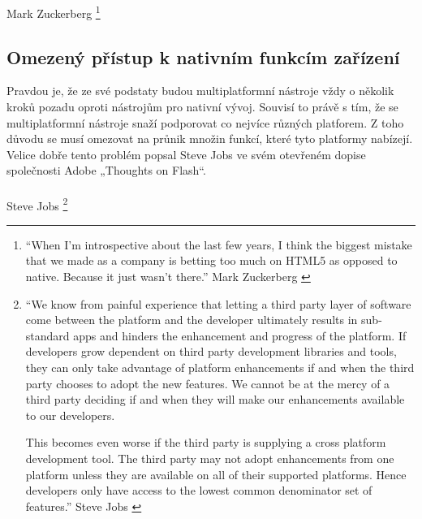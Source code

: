 \textit{} Mark Zuckerberg \cite{html5_isnt_fb_mistake}
\footnote{“When I'm introspective about the last few years, I think the biggest mistake that we made as a company is betting too much on HTML5 as opposed to native. Because it just wasn't there.” Mark Zuckerberg \cite{html5_isnt_fb_mistake}} \\

\subsection{Omezený přístup k nativním funkcím zařízení}
Pravdou je, že ze své podstaty budou multiplatformní nástroje vždy o několik kroků pozadu oproti nástrojům pro nativní vývoj. Souvisí to právě s tím, že se multiplatformní nástroje snaží podporovat co nejvíce různých platforem. Z toho důvodu se musí omezovat na průnik množin funkcí, které tyto platformy nabízejí. Velice dobře tento problém popsal Steve Jobs ve svém otevřeném dopise společnosti Adobe „Thoughts on Flash“.
\\ \\
\textit{} Steve Jobs \cite{thoughts_on_flash}
\footnote{“We know from painful experience that letting a third party layer of software come between the platform and the developer ultimately results in sub-standard apps and hinders the enhancement and progress of the platform. If developers grow dependent on third party development libraries and tools, they can only take advantage of platform enhancements if and when the third party chooses to adopt the new features. We cannot be at the mercy of a third party deciding if and when they will make our enhancements available to our developers.

This becomes even worse if the third party is supplying a cross platform development tool. The third party may not adopt enhancements from one platform unless they are available on all of their supported platforms. Hence developers only have access to the lowest common denominator set of features.” Steve Jobs \cite{thoughts_on_flash}}\\

